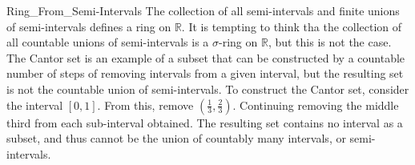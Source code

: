         \begin{lexample}{}{Ring_From_Semi-Intervals}
            The collection of all semi-intervals and finite
            unions of semi-intervals defines a ring on
            $\mathbb{R}$. It is tempting to think tha the
            collection of all countable unions of semi-intervals
            is a $\sigma$-ring on $\mathbb{R}$, but this is not
            the case. The Cantor set is an example of a subset
            that can be constructed by a countable number of
            steps of removing intervals from a given interval,
            but the resulting set is not the countable union of
            semi-intervals. To construct the Cantor set, consider
            the interval $[0,1]$. From this, remove
            $(\frac{1}{3},\frac{2}{3})$. Continuing removing the
            middle third from each sub-interval obtained. The
            resulting set contains no interval as a subset, and
            thus cannot be the union of countably many intervals,
            or semi-intervals.
        \end{lexample}
